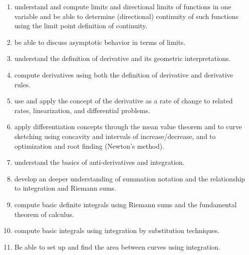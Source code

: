 \documentclass[11pt]{article}
\newenvironment{alphalist}{
\begin{enumerate}[label=(\arabic*),widest=107 ,leftmargin=25pt, itemsep=0pt]}
{\end{enumerate}}
\begin{document}
\begin{alphalist}
    \item  understand and compute limits and directional limits of functions in one variable and be able to determine (directional) continuity of such functions using the limit point definition of continuity.
    
    \item be able to discuss asymptotic behavior in terms of limits.

    \item understand the definition of derivative and its geometric interpretations.

    \item  compute derivatives using both the definition of derivative and derivative rules.

    \item use and apply the concept of the derivative as a rate of change to related rates, linearization, and differential problems.
    
    \item apply differentiation concepts through the mean value theorem and to curve sketching using concavity and intervals of increase/decrease, and to optimization and root finding (Newton's method).
    
    \item  understand the basics of anti-derivatives and integration.

    \item  develop an deeper understanding of summation notation and the relationship to integration and Riemann sums.
    
    \item compute basic definite integrals using Riemann sums and the fundamental theorem of calculus.

    \item compute basic integrals using integration by substitution techniques.

    \item  Be able to set up and find the area between curves using integration.
    
    \end{alphalist}
\end{document}
